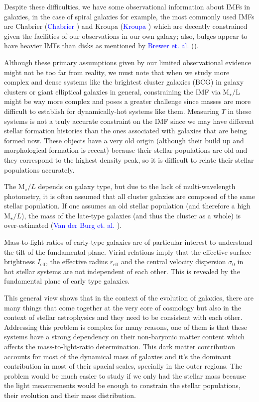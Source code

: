 Despite these difficulties, we have some observational information about IMFs in galaxies, in the case of spiral galaxies for example, the most commonly used IMFs are Chabrier (\textcolor{blue}{Chabrier} \citeyear{Reference31}) and Kroupa (\textcolor{blue}{Kroupa} \citeyear{Reference30}) which are decently constrained given the facilities of our observations in our own galaxy; also, bulges appear to have heavier IMFs than disks as mentioned by \textcolor{blue}{Brewer et. al.} (\citeyear{Reference16}). 

Although these primary assumptions given by our limited observational evidence might not be too far from reality, we must note that when we study more complex and dense systems like the brightest cluster galaxies (BCG) in galaxy clusters or giant elliptical galaxies in general, constraining the IMF via $\textrm{M}_{\star}/\textrm{L}$ might be way more complex and poses a greater challenge since masses are more difficult to establish for dynamically-hot systems like them. Measuring $\Upsilon$ in these systems is not a truly accurate constraint on the IMF since we may have different stellar formation histories than the ones associated with galaxies that are being formed now. These objects have a very old origin (although their build up and morphological formation is recent) because their stellar populations are old and they correspond to the highest density peak, so it is difficult to relate their stellar populations accurately.

The $\text{M}_{\star}/L$ depends on galaxy type, but due to the lack of multi-wavelength photometry, it is often assumed that all cluster galaxies are composed of the same stellar population. If one assumes an old stellar population (and therefore a high $\text{M}_{\star}/L$), the mass of the late-type galaxies (and thus the cluster as a whole) is over-estimated (\textcolor{blue}{Van der Burg et. al.} \citeyear{Reference2}).

Mass-to-light ratios of early-type galaxies are of particular interest to understand the tilt of the fundamental plane. Virial relations imply that the effective surface brightness $I_{\text{eff}}$, the effective radius $r_{\text{eff}}$ and the central velocity dispersion $\sigma_{0}$ in hot stellar systems are not independent of each other. This is revealed by the fundamental plane of early type galaxies.

This general view shows that in the context of the evolution of galaxies, there are many things that come together at the very core of cosmology but also in the context of stellar astrophysics and they need to be consistent with each other. Addressing this problem is complex for many reasons, one of them is that these systems have a strong dependency on their non-baryonic matter content which affects the mass-to-light-ratio determination. This dark matter contribution accounts for most of the dynamical mass of galaxies and it's the dominant contribution in most of their spacial scales, specially in the outer regions. The problem would be much easier to study if we only had the stellar mass because the light measurements would be enough to constrain the stellar populations, their evolution and their mass distribution. 

